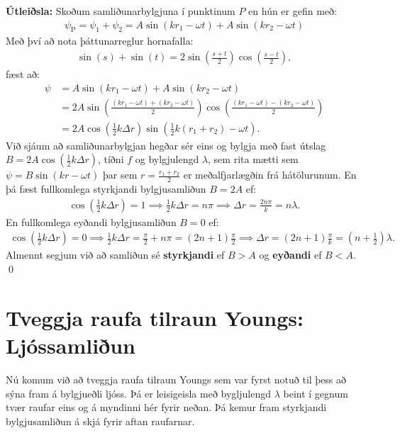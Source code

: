 \ifdefined \wholebook \else\documentclass[oneside]{book}\usepackage{EdlBook}\graphicspath{{figures/}}
\begin{document}
\textbf{Útleiðsla:} Skoðum samliðunarbylgjuna í punktinum $P$ en hún er gefin með:
\begin{align*}
    \psi_{\text{P}} = \psi_1 + \psi_2 = A \sin(k r_1 - \omega t) +  A \sin(k r_2 - \omega t)
\end{align*}
Með því að nota þáttunarreglur hornafalla:
\begin{align*}
    \sin(s) + \sin(t) = 2\sin(\frac{s+t}{2})\cos(\frac{s-t}{2}),
\end{align*}
fæst að:
\begin{align*}
    \psi &= A \sin(k r_1 - \omega t) +  A \sin(k r_2 - \omega t) \\
    &= 2A\sin(\frac{\left(kr_1 - \omega t\right) + \left(k r_2 -\omega t\right)}{2})\cos(\frac{\left( k r_1 - \omega t \right) - \left( kr_2 - \omega t \right)}{2}) \\
    &= 2A\cos(\frac{1}{2}k\Delta r)\sin(\frac{1}{2}k(r_1+r_2)-\omega t).
\end{align*}
Við sjáum að samliðunarbylgjan hegðar sér eins og bylgja með fast útslag $B = 2A\cos(\frac{1}{2}k\Delta r)$, tíðni $f$ og bylgjulengd $\lambda$, sem rita mætti sem $\psi = B\sin(kr - \omega t)$ þar sem $r =  \frac{r_1 + r_2}{2}$ er meðalfjarlægðin frá hátölurunum. En þá fæst fullkomlega styrkjandi bylgjusamliðun $B = 2A$ ef:
\begin{align*}
    \cos(\frac{1}{2}k\Delta r) = 1 \implies \frac{1}{2}k\Delta r = n\pi \implies \Delta r = \frac{2n\pi}{k} = n\lambda.
\end{align*}
En fullkomlega eyðandi bylgjusamliðun $B = 0$ ef:
\begin{align*}
    \cos(\frac{1}{2}k\Delta r) = 0 \implies \frac{1}{2}k\Delta r = \frac{\pi}{2} + n\pi = (2n+1)\frac{\pi}{2} \implies \Delta r = (2n +1)\frac{\pi}{k} = \left(n + \frac{1}{2}\right)\lambda.
\end{align*}
Almennt segjum við að samliðun sé \textbf{styrkjandi} ef $B > A$ og \textbf{eyðandi} ef $B < A$. \qed



\section{Tveggja raufa tilraun Youngs: Ljóssamliðun}

Nú komum við að tveggja raufa tilraun Youngs sem var fyrst notuð til þess að sýna fram á bylgjueðli ljóss. Þá er leisigeisla með bygljulengd $\lambda$ beint í gegnum tvær raufar eins og á myndinni hér fyrir neðan. Þá kemur fram styrkjandi bylgjusamliðun á skjá fyrir aftan raufarnar.
\end{document}
